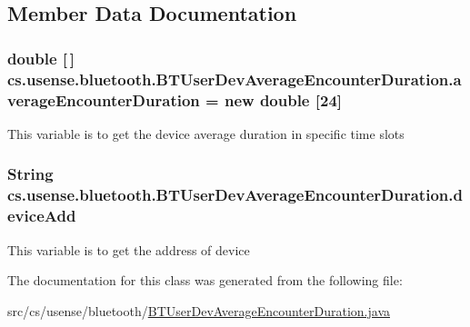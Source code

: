 \subsection{Member Data Documentation}
\hypertarget{classcs_1_1usense_1_1bluetooth_1_1_b_t_user_dev_average_encounter_duration_a21d7be603cc2ed537e6e1aea1139af4d}{}
\subsubsection[{average\+Encounter\+Duration}]{\setlength{\rightskip}{0pt plus 5cm}double \mbox{[}$\,$\mbox{]} cs.\+usense.\+bluetooth.\+B\+T\+User\+Dev\+Average\+Encounter\+Duration.\+average\+Encounter\+Duration = new double \mbox{[}24\mbox{]}\hspace{0.3cm}{\ttfamily [private]}}\label{classcs_1_1usense_1_1bluetooth_1_1_b_t_user_dev_average_encounter_duration_a21d7be603cc2ed537e6e1aea1139af4d}
This variable is to get the device average duration in specific time slots \hypertarget{classcs_1_1usense_1_1bluetooth_1_1_b_t_user_dev_average_encounter_duration_abba9d543af176e11a65c0221bb558685}{}
\subsubsection[{device\+Add}]{\setlength{\rightskip}{0pt plus 5cm}String cs.\+usense.\+bluetooth.\+B\+T\+User\+Dev\+Average\+Encounter\+Duration.\+device\+Add\hspace{0.3cm}{\ttfamily [private]}}\label{classcs_1_1usense_1_1bluetooth_1_1_b_t_user_dev_average_encounter_duration_abba9d543af176e11a65c0221bb558685}
This variable is to get the address of device 

The documentation for this class was generated from the following file\+:\begin{DoxyCompactItemize}
\item 
src/cs/usense/bluetooth/\hyperlink{_b_t_user_dev_average_encounter_duration_8java}{B\+T\+User\+Dev\+Average\+Encounter\+Duration.\+java}\end{DoxyCompactItemize}
